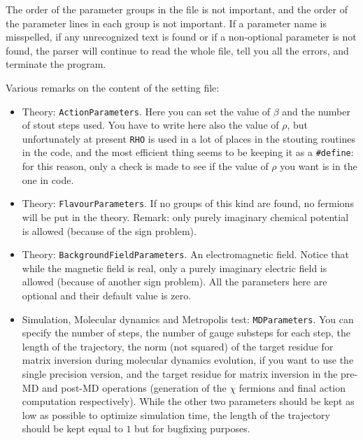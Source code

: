 The order of the parameter groups in the file is not important, and the order 
of the parameter lines in each group is not important. If a parameter name is 
misspelled, if any unrecognized text is found or if a non-optional parameter 
is not found, the parser will continue to read the whole file, tell you all 
the errors, and terminate the program.

Various remarks on the content of the setting file:

\begin{itemize}
    \item{Theory: \verb|ActionParameters|.}
        Here you can set the value of $\beta$ and the number of stout steps used. You 
        have to write here also the value of $\rho$, but unfortunately at present 
        \verb|RHO| is used in a lot of places in the stouting routines in the code, and 
        the most efficient thing seems to be keeping it as a \verb|#define|: for this 
        reason, only a check is made to see if the value of $\rho$ you want is in 
        the one in code.
    \item{Theory: \verb|FlavourParameters|.}
        If no groups of this kind are found, no fermions will be put in the theory.
        Remark: only purely imaginary chemical potential is allowed (because of the 
        sign problem). 
    \item{Theory: \verb|BackgroundFieldParameters|.}
        An electromagnetic field. Notice that while the magnetic field is real, only 
        a purely imaginary electric field is allowed (because of another sign 
problem). All the parameters here are optional and their default value is zero.
    \item{Simulation, Molecular dynamics and Metropolis test: \verb|MDParameters|.} You can specify the number of steps, 
        the number of gauge substeps for each step, the length of the 
        trajectory, the norm (not squared) of the target residue for matrix 
        inversion during molecular dynamics evolution, if you want to use 
        the single precision version, and the target residue for matrix 
inversion in the pre-MD and post-MD operations (generation of the $\chi$ 
fermions and final action computation respectively). While the other two 
parameters should be kept as  
        low as possible to optimize simulation time, the length of the trajectory 
        should be kept equal to $1$ but for bugfixing purposes.


\end{itemize}
